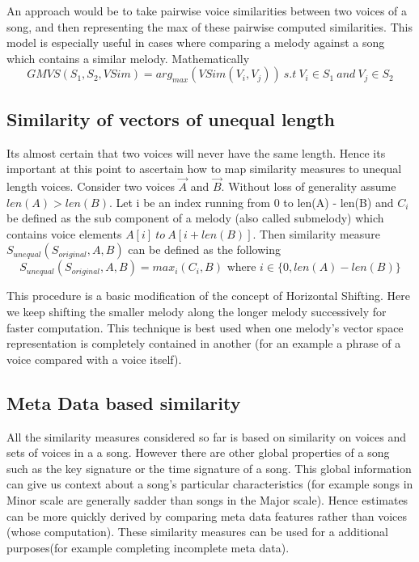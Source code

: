  An approach would be to take pairwise voice similarities between two voices of a song, and then representing the max of these pairwise computed similarities. This model is especially useful in cases where comparing a melody against a song which contains a similar melody. Mathematically 
\begin{equation}
GMVS(S_1, S_2, VSim) = arg_{max} (VSim(V_i, V_j)) \ s.t \ V_i \in S_1 \ and \ V_j \in S_2
\end{equation}

\subsection{Similarity of vectors of unequal length} \label{sim:unequal}

\noindent Its almost certain that two voices will  never have the same length. Hence its important at this point to ascertain how to map similarity measures to unequal length voices. Consider two voices $\vec{A}$ and $\vec{B}$. Without loss of generality assume $len(A) > len(B)$. Let i be an index running from 0 to len(A) - len(B) and $C_i$ be defined as the sub component of a melody (also called submelody) which contains voice elements $A[i] \ to \ A[i + len(B)]$. Then similarity measure $S_{unequal}(S_{original}, A, B)$ can be defined as the following
\begin{equation}
S_{unequal}(S_{original}, A, B) = max_i (C_i, B) \text{ where } i \in \{0, len(A) - len(B)\}
\end{equation}

\noindent This procedure is a basic modification of the concept of Horizontal Shifting\cite{similietechnicalmanual}. Here we keep shifting the smaller melody along the longer melody successively for faster computation. This technique is best used when one melody's vector space representation is completely contained in another (for an example a phrase of a voice compared with a voice itself).

\subsection{Meta Data based similarity}

\noindent All the similarity measures considered so far is based on similarity on voices and sets of voices in a a song. However there are other global properties of a song such as the key signature or the time signature of a song. This global information can give us context about a song's particular characteristics (for example songs in Minor scale are generally sadder than songs in the Major scale). Hence estimates can be more quickly derived by comparing meta data features rather than voices (whose computation). These similarity measures can be used for a additional purposes(for example completing incomplete meta data). 

